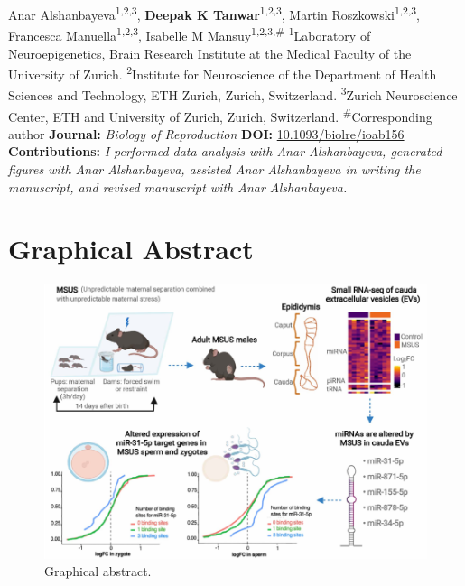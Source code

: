 \documentclass[12pt,twoside]{reedthesis}
\begin{document}
Anar Alshanbayeva\textsuperscript{1,2,3}, \textbf{Deepak K
Tanwar}\textsuperscript{1,2,3}, Martin
Roszkowski\textsuperscript{1,2,3}, Francesca
Manuella\textsuperscript{1,2,3}, Isabelle M
Mansuy\textsuperscript{1,2,3,\#} \newline \newline
\textsuperscript{1}Laboratory of Neuroepigenetics, Brain Research
Institute at the Medical Faculty of the University of Zurich. \newline
\textsuperscript{2}Institute for Neuroscience of the Department of
Health Sciences and Technology, ETH Zurich, Zurich, Switzerland.
\newline \textsuperscript{3}Zurich Neuroscience Center, ETH and
University of Zurich, Zurich, Switzerland. \newline \newline
\textsuperscript{\#}Corresponding author \newline \newline
\textbf{Journal:} \emph{Biology of Reproduction} \newline \newline 
\textbf{DOI:} \href{https://doi.org/10.1093/biolre/ioab156}{10.1093/biolre/ioab156}
\newline \newline
\textbf{Contributions:} \emph{I performed data analysis with Anar Alshanbayeva,
generated figures with Anar Alshanbayeva, assisted Anar Alshanbayeva in
writing the manuscript, and revised manuscript with Anar Alshanbayeva.}

\newpage

\hypertarget{graphical-abstract-1}{%
\section{Graphical Abstract}\label{graphical-abstract-1}}
\begin{figure}[htbp]

{\centering \includegraphics{thesis_files/figure-latex/cf1-1} 

}

\caption[Graphical abstract]{Graphical abstract.}\label{fig:cf1}
\end{figure}
\newpage
\end{document}

